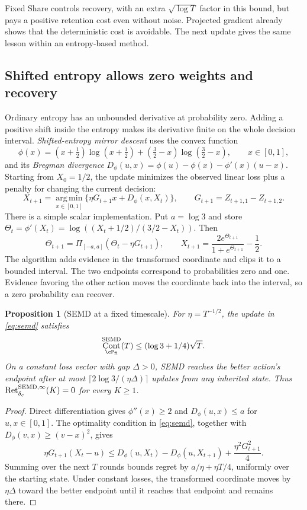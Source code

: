 \documentclass[11pt,twoside]{article}
\newtheorem{proposition}[theorem]{Proposition}
\theoremstyle{definition}
\theoremstyle{remark}
\DeclareMathOperator{\Cont}{Cont}
\DeclareMathOperator{\Ret}{Ret}
\begin{document}
Fixed Share controls recovery, with an extra $\sqrt{\log T}$ factor in
this bound, but pays a positive retention cost even without noise.
Projected gradient already shows that the deterministic cost is avoidable.
The next update gives the same lesson within an entropy-based method.

\subsection{Shifted entropy allows zero weights and recovery}

Ordinary entropy has an unbounded derivative at probability zero. Adding
a positive shift inside the entropy makes its derivative finite on the
whole decision interval. \emph{Shifted-entropy mirror descent}
uses the convex function
\[
 \phi(x)=(x+\tfrac12)\log(x+\tfrac12)
       +(\tfrac32-x)\log(\tfrac32-x),\qquad x\in[0,1],
\]
and its \emph{Bregman divergence}
$D_\phi(u,x)=\phi(u)-\phi(x)-\phi'(x)(u-x)$.
Starting from $X_0=1/2$, the update minimizes the observed linear loss
plus a penalty for changing the current decision:
\begin{equation}
 X_{t+1}=\operatorname*{arg\,min}_{x\in[0,1]}
       \{\eta G_{t+1}x+D_\phi(x,X_t)\},\qquad
 G_{t+1}=Z_{t+1,1}-Z_{t+1,2}.
 \label{eq:semd}
\end{equation}
There is a simple scalar implementation. Put $a=\log3$ and store
$\Theta_t=\phi'(X_t)=\log((X_t+1/2)/(3/2-X_t))$. Then
\[
 \Theta_{t+1}=\Pi_{[-a,a]}(\Theta_t-\eta G_{t+1}),\qquad
 X_{t+1}=\frac{2e^{\Theta_{t+1}}}{1+e^{\Theta_{t+1}}}-\frac12.
\]
The algorithm adds evidence in the transformed coordinate and clips it to
a bounded interval. The two endpoints correspond to probabilities zero
and one. Evidence favoring the other action moves the coordinate back
into the interval, so a zero probability can recover.

\begin{proposition}[SEMD at a fixed timescale]
\label{ex:semd}
For $\eta=T^{-1/2}$, the update in \cref{eq:semd} satisfies
\[
 \Cont_{\cP_{\rm fi}}^{\rm SEMD}(T)
 \le(\log3+1/4)\sqrt T.
\]
On a constant loss vector with gap $\Delta>0$, SEMD reaches the better
action's endpoint after at most $\lceil2\log3/(\eta\Delta)\rceil$
updates from any inherited state. Thus
$\Ret_{\delta_c}^{{\rm SEMD},\infty}(K)=0$ for every $K\ge1$.
\end{proposition}
\begin{proof}
Direct differentiation gives $\phi''(x)\ge2$ and
$D_\phi(u,x)\le a$ for $u,x\in[0,1]$. The optimality condition in
\cref{eq:semd}, together with $D_\phi(v,x)\ge(v-x)^2$, gives
\[
 \eta G_{t+1}(X_t-u)
 \le D_\phi(u,X_t)-D_\phi(u,X_{t+1})
        +\frac{\eta^2G_{t+1}^2}{4}.
\]
Summing over the next $T$ rounds bounds regret by $a/\eta+\eta T/4$,
uniformly over the starting state. Under constant losses, the transformed
coordinate moves by $\eta\Delta$ toward the better endpoint until it
reaches that endpoint and remains there.
\end{proof}
\end{document}
